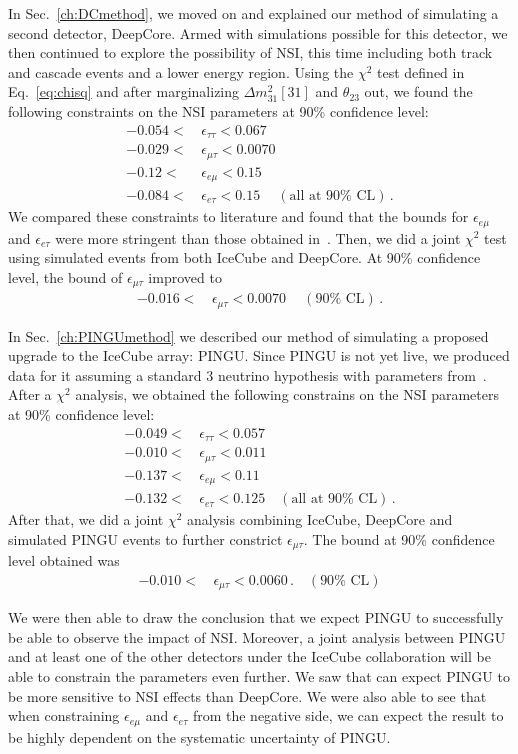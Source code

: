 \documentclass{revtex4-2}
\newcommand{\emt}{\ensuremath{\epsilon_{\mu\tau}}}
\newcommand{\eet}{\epsilon_{e\tau}}
\newcommand{\eem}{\epsilon_{e\mu}}
\newcommand{\ett}{\ensuremath{\epsilon_{\tau\tau}}}
\newcommand{\dm}{\Delta m^2_{31}}
\begin{document}
{{In Sec.~\ref{ch:DCmethod}, we moved on and explained our method of simulating a second detector, DeepCore. Armed with simulations possible for this detector, we then continued to explore the possibility of NSI, this time including both track and cascade events and a lower energy region.
Using the $\chi^2$ test defined in Eq.~\ref{eq:chisq} and after marginalizing $\dm[31]$ and $\theta_{23}$ out, we found the following constraints on the NSI parameters at 90\% confidence level:
\begin{align}
    -0.054 <&\, \ett < 0.067 \nonumber \\
    -0.029 <&\, \emt < 0.0070 \nonumber \\
    -0.12 <&\, \eem < 0.15 \nonumber \\
    -0.084 <&\, \eet < 0.15\ \quad (\text{all at }90\% \text{ CL})\,.
 \end{align}
We compared these constraints to literature and found that the bounds for $\eem$ and $\eet$ were more stringent than those obtained in~\cite{demidov}.
Then, we did a joint $\chi^2$ test using simulated events from both IceCube and DeepCore. At 90\% confidence level, the bound of $\emt$ improved to
\begin{align}
    -0.016 <&\, \emt < 0.0070\ \quad (90\% \text{ CL})\,.
 \end{align}

In Sec.~\ref{ch:PINGUmethod} we described our method of simulating a proposed upgrade to the IceCube array: PINGU.
Since PINGU is not yet live, we produced data for it assuming a standard $3$ neutrino hypothesis with parameters from~\cite{nufit}.
After a $\chi^2$ analysis, we obtained the following constrains on the NSI parameters at 90\% confidence level:
\begin{align}
    -0.049 <&\, \ett < 0.057 \nonumber \\
    -0.010 <&\, \emt < 0.011 \nonumber \\
    -0.137 <&\, \eem < 0.11 \nonumber \\
    -0.132 <&\, \eet < 0.125 \quad (\text{all at }90\% \text{ CL})\,.
 \end{align}
After that, we did a joint $\chi^2$ analysis combining IceCube, DeepCore and simulated PINGU events to further constrict $\emt$. The bound at 90\% confidence level obtained was
\begin{align}
    -0.010 <&\, \emt < 0.0060\,. \quad (90\% \text{ CL})
 \end{align}

We were then able to draw the conclusion that we expect PINGU to successfully be able to observe the impact of NSI. Moreover, a joint analysis between PINGU and at least one of the other detectors under the IceCube collaboration
will be able to constrain the parameters even further. We saw that can expect PINGU to be more sensitive to NSI effects than DeepCore. We were also able to see that when constraining $\eem$ and $\eet$ from the negative side, 
we can expect the result to be highly dependent on the systematic uncertainty of PINGU.

}}
\end{document}
